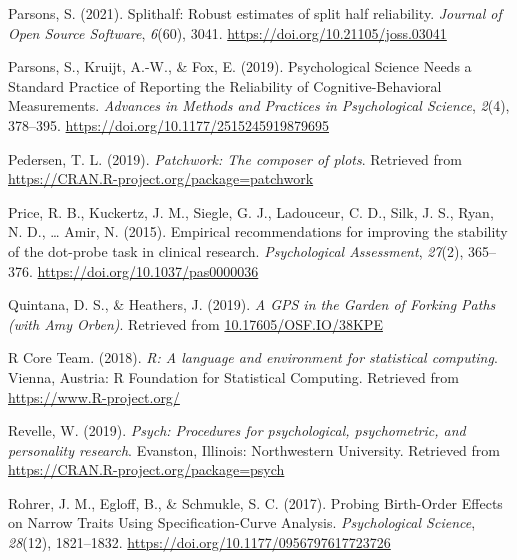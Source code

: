 \documentclass[
  man,floatsintext]{apa6}
\newlength{\cslhangindent}
\newlength{\cslentryspacingunit} %
\newenvironment{CSLReferences}[2] %
 {%
  \setlength{\parindent}{0pt}
  \ifodd #1
  \let\oldpar\par
  \def\par{\hangindent=\cslhangindent\oldpar}
  \fi
  \setlength{\parskip}{#2\cslentryspacingunit}
 }%
 {}
\begin{document}
\begin{CSLReferences}{1}{0}
\leavevmode{}%
Parsons, S. (2021). Splithalf: Robust estimates of split half reliability. \emph{Journal of Open Source Software}, \emph{6}(60), 3041. \url{https://doi.org/10.21105/joss.03041}

\leavevmode{}%
Parsons, S., Kruijt, A.-W., \& Fox, E. (2019). Psychological {Science} {Needs} a {Standard} {Practice} of {Reporting} the {Reliability} of {Cognitive}-{Behavioral} {Measurements}. \emph{Advances in Methods and Practices in Psychological Science}, \emph{2}(4), 378--395. \url{https://doi.org/10.1177/2515245919879695}

\leavevmode{}%
Pedersen, T. L. (2019). \emph{Patchwork: The composer of plots}. Retrieved from \url{https://CRAN.R-project.org/package=patchwork}

\leavevmode{}%
Price, R. B., Kuckertz, J. M., Siegle, G. J., Ladouceur, C. D., Silk, J. S., Ryan, N. D., \ldots{} Amir, N. (2015). Empirical recommendations for improving the stability of the dot-probe task in clinical research. \emph{Psychological Assessment}, \emph{27}(2), 365--376. \url{https://doi.org/10.1037/pas0000036}

\leavevmode{}%
Quintana, D. S., \& Heathers, J. (2019). \emph{A {GPS} in the {Garden} of {Forking} {Paths} (with {Amy} {Orben})}. Retrieved from \href{https://10.17605/OSF.IO/38KPE}{10.17605/OSF.IO/38KPE}

\leavevmode{}%
R Core Team. (2018). \emph{R: A language and environment for statistical computing}. Vienna, Austria: R Foundation for Statistical Computing. Retrieved from \url{https://www.R-project.org/}

\leavevmode{}%
Revelle, W. (2019). \emph{Psych: Procedures for psychological, psychometric, and personality research}. Evanston, Illinois: Northwestern University. Retrieved from \url{https://CRAN.R-project.org/package=psych}

\leavevmode{}%
Rohrer, J. M., Egloff, B., \& Schmukle, S. C. (2017). Probing {Birth}-{Order} {Effects} on {Narrow} {Traits} {Using} {Specification}-{Curve} {Analysis}. \emph{Psychological Science}, \emph{28}(12), 1821--1832. \url{https://doi.org/10.1177/0956797617723726}


\end{CSLReferences}
\end{document}
